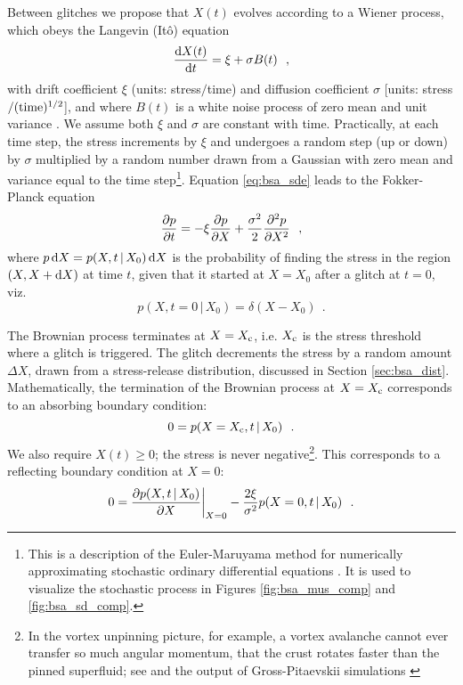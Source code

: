 Between glitches we propose that $X(t)$ evolves according to a Wiener process, which obeys the Langevin (It\^{o}) equation
\begin{equation}
\label{eq:bsa_sde}
\frac{\textrm{d} X(t)}{\textrm{d} t} = \xi + \sigma B(t)\ \ ,
\end{equation}
with drift coefficient $\xi$ (units: stress$/$time) and diffusion coefficient $\sigma$ [units: stress$/({\rm time})^{1/2}$], and where $B(t)$ is a white noise process of zero mean and unit variance \citep{Cox1965, Gardiner2009}. We assume both $\xi$ and $\sigma$ are constant with time. Practically, at each time step, the stress increments by $\xi$ and undergoes a random step (up or down) by $\sigma$ multiplied by a random number drawn from a Gaussian with zero mean and variance equal to the time step\footnote{This is a description of the Euler-Maruyama method for numerically approximating stochastic ordinary differential equations \citep{Kloeden1992}. It is used to visualize the stochastic process in Figures \ref{fig:bsa_mus_comp} and \ref{fig:bsa_sd_comp}.}. Equation \eqref{eq:bsa_sde} leads to the Fokker-Planck equation 
\begin{equation}
\label{eq:bsa_cke}
\pd{p}{t} = -\xi \pd{p}{X} + \frac{\sigma^2}{2} \pd{^2p}{X^2}\ \ ,
\end{equation}
where $p\,\textrm{d} X = p(X, t \,|\, X_0)\, \textrm{d} X$ is the probability of finding the stress in the region $(X, X + \textrm{d} X)$ at time $t$, given that it started at $X=X_0$ after a glitch at $t=0$, viz.
\begin{equation}
\label{eq:bsa_ic}
p(X, t=0 \,|\, X_0) = \delta(X - X_0)\ \ .
\end{equation}

The Brownian process terminates at $X=X_\textrm{c}$, i.e. $X_\textrm{c}$ is the stress threshold where a glitch is triggered. The glitch decrements the stress by a random amount $\Delta X$, drawn from a stress-release distribution, discussed in Section \ref{sec:bsa_dist}. Mathematically, the termination of the Brownian process at $X=X_\textrm{c}$ corresponds to an absorbing boundary condition:
\begin{equation}
\label{eq:bsa_abs}
0 = p(X=X_\textrm{c}, t \,|\, X_0)\ \ .
\end{equation}
We also require $X(t) \geq 0$; the stress is never negative\footnote{In the vortex unpinning picture, for example, a vortex avalanche cannot ever transfer so much angular momentum, that the crust rotates faster than the pinned superfluid; see \citet{Fulgenzi2017} and the output of Gross-Pitaevskii simulations \citep{Warszawski2011}}. This corresponds to a reflecting boundary condition at $X=0$:
\begin{equation}
\label{eq:bsa_refl}	
0 = \frac{\partial p(X, t \,|\, X_0)}{\partial X}\bigg\vert_{X=0} - \frac{2 \xi}{\sigma^2} p(X=0, t \,|\, X_0)\ \ . 
\end{equation}

